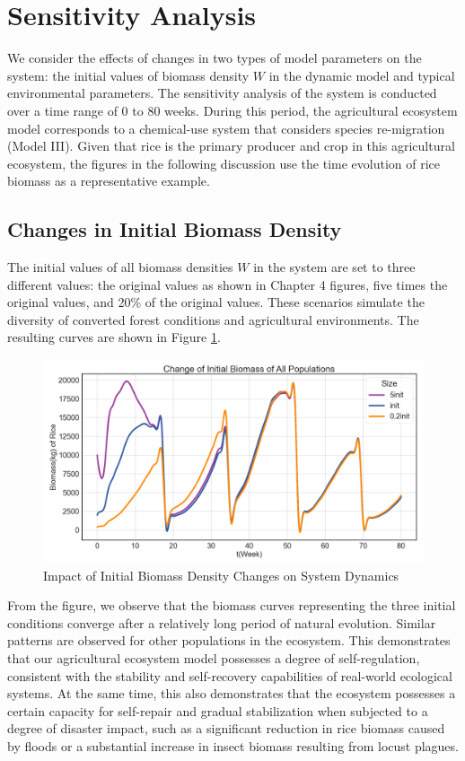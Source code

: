 \documentclass{HZNUMCM}
\begin{document}
  \section{Sensitivity Analysis}
    We consider the effects of changes in two types of model parameters on the system: 
    the initial values of biomass density \( W \) in the dynamic model and typical environmental parameters. 
    The sensitivity analysis of the system is conducted over a time range of 0 to 80 weeks. 
    During this period, the agricultural ecosystem model corresponds to a chemical-use system that considers species re-migration (Model III). 
    Given that rice is the primary producer and crop in this agricultural ecosystem, 
    the figures in the following discussion use the time evolution of rice biomass as a representative example.

    \subsection{Changes in Initial Biomass Density}
      The initial values of all biomass densities \( W \) in the system are set to three different values: 
      the original values as shown in Chapter 4 figures, five times the original values, and 20\% of the original values. 
      These scenarios simulate the diversity of converted forest conditions and agricultural environments. 
      The resulting curves are shown in Figure \ref{fig:Change_init}.

      \begin{figure}[H]
        \centering
        \includegraphics[width=0.6\linewidth]{images/Change_init.png}
        \caption{Impact of Initial Biomass Density Changes on System Dynamics}
        \label{fig:Change_init}
      \end{figure}

      From the figure, we observe that the biomass curves representing the three initial conditions converge after a relatively long period of natural evolution. 
      Similar patterns are observed for other populations in the ecosystem. 
      This demonstrates that our agricultural ecosystem model possesses a degree of self-regulation, 
      consistent with the stability and self-recovery capabilities of real-world ecological systems.
      At the same time, this also demonstrates that the ecosystem possesses a certain capacity for self-repair and gradual stabilization when subjected to a degree of disaster impact, 
      such as a significant reduction in rice biomass caused by floods or a substantial increase in insect biomass resulting from locust plagues. 
\end{document}
